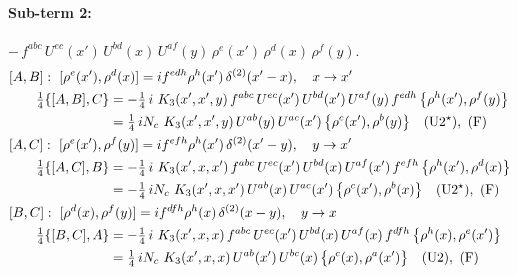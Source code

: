 \documentclass[10pt]{article}
\numberwithin{equation}{section}
\begin{document}
\paragraph{Sub-term 2:} $-\,f^{abc}\,U^{ec}(x')\,U^{bd}(x)\,U^{af}(y)\,\rho^{e}(x')\,\rho^{d}(x)\,\rho^{f}(y)$.
\begin{align}
&[A,B]:\ [\rho^{e}(x'),\rho^{d}(x)]=i f^{edh}\rho^{h}(x')\,\delta^{(2)}(x'-x),\quad x\to x'\notag\\
&\qquad \tfrac14\{[A,B],C\}=-\tfrac14\,i\,\,K_3(x',x',y)\,f^{abc}\,U^{ec}(x')\,U^{bd}(x')\,U^{af}(y)\,f^{edh}\,\big\{\rho^{h}(x'),\rho^{f}(y)\big\}\notag\\
&\qquad\phantom{\tfrac14\{[A,B],C\}}=\tfrac14\,i N_{c}\,\,K_3(x',x',y)\,U^{ab}(y)\,U^{ac}(x')\,\big\{\rho^{c}(x'),\rho^{b}(y)\big\}\quad\text{(U2$^\star$)},\ \text{(F)}
\label{eq:B2-2-AB}\\
&[A,C]:\ [\rho^{e}(x'),\rho^{f}(y)]=i f^{efh}\rho^{h}(x')\,\delta^{(2)}(x'-y),\quad y\to x'\notag\\
&\qquad \tfrac14\{[A,C],B\}=-\tfrac14\,i\,\,K_3(x',x,x')\,f^{abc}\,U^{ec}(x')\,U^{bd}(x)\,U^{af}(x')\,f^{efh}\,\big\{\rho^{h}(x'),\rho^{d}(x)\big\}\notag\\
&\qquad\phantom{\tfrac14\{[A,C],B\}}=-\tfrac14\,i N_{c}\,\,K_3(x',x,x')\,U^{ab}(x)\,U^{ac}(x')\,\big\{\rho^{c}(x'),\rho^{b}(x)\big\}\quad\text{(U2$^\star$)},\ \text{(F)}
\label{eq:B2-2-AC}\\
&[B,C]:\ [\rho^{d}(x),\rho^{f}(y)]=i f^{dfh}\rho^{h}(x)\,\delta^{(2)}(x-y),\quad y\to x\notag\\
&\qquad \tfrac14\{[B,C],A\}=-\tfrac14\,i\,\,K_3(x',x,x)\,f^{abc}\,U^{ec}(x')\,U^{bd}(x)\,U^{af}(x)\,f^{dfh}\,\big\{\rho^{h}(x),\rho^{e}(x')\big\}\notag\\
&\qquad\phantom{\tfrac14\{[B,C],A\}}=\tfrac14\,i N_{c}\,\,K_3(x',x,x)\,U^{ab}(x')\,U^{bc}(x)\,\big\{\rho^{c}(x),\rho^{a}(x')\big\}\quad\text{(U2)},\ \text{(F)}
\label{eq:B2-2-BC}
\end{align}
\end{document}
